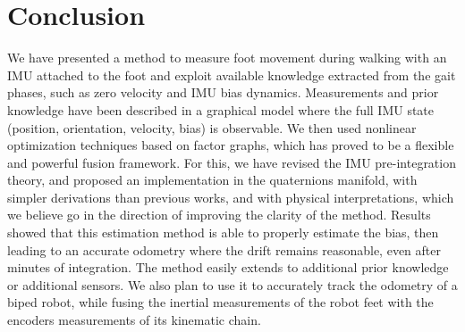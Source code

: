 
\section{Conclusion}

We have presented a method to measure foot movement during walking with an IMU attached to the foot and exploit available knowledge extracted from the gait phases, such as zero velocity and IMU bias dynamics. 
Measurements and prior knowledge have been described in a graphical model where the full IMU state (position, orientation, velocity, bias) is observable. 
We then used nonlinear optimization techniques based on factor graphs, which has proved to be a flexible and powerful fusion framework. For this, we have revised the IMU pre-integration theory, and proposed an implementation in the quaternions manifold, with simpler derivations than previous works, and with physical interpretations, which we believe go in the direction of improving the clarity of the method.
Results showed that this estimation method is able to properly estimate the bias, then leading to an accurate odometry where the drift remains reasonable, even after minutes of integration. 
The method easily extends to additional prior knowledge or additional sensors. 
We also plan to use it to accurately track the odometry of a biped robot, while fusing the inertial measurements of the robot feet with the encoders measurements of its kinematic chain. 
